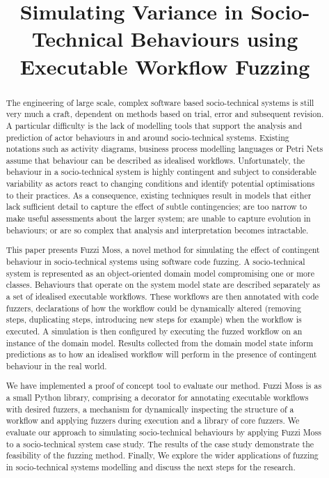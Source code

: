 \documentclass{sig-alternate}
\title{Simulating Variance in Socio-Technical Behaviours using Executable Workflow Fuzzing}
\begin{document}

\maketitle


\begin{abstract}
  The engineering of large scale, complex software based socio-technical systems is still very much a craft, dependent
  on methods based on trial, error and subsequent revision.  A particular difficulty is the lack of modelling tools that
  support the analysis and prediction of actor behaviours in and around socio-technical systems.  Existing notations
  such as activity diagrams, business process modelling languages or Petri Nets assume that behaviour can be described
  as idealised workflows.  Unfortunately, the behaviour in a socio-technical system is highly contingent and subject to
  considerable variability as actors react to changing conditions and identify potential optimisations to their
  practices.  As a consequence, existing techniques result in models that either lack sufficient detail to capture the
  effect of subtle contingencies; are too narrow to make useful assessments about the larger system; are unable to
  capture evolution in behaviours; or are so complex that analysis and interpretation becomes intractable.

  This paper presents Fuzzi Moss, a novel method for simulating the effect of contingent behaviour in socio-technical
  systems using software code fuzzing.  A socio-technical system is represented as an object-oriented domain model
  compromising one or more classes.  Behaviours that operate on the system model state are described separately as a set
  of idealised executable workflows.  These workflows are then annotated with code fuzzers, declarations of how the
  workflow could be dynamically altered (removing steps, duplicating steps, introducing new steps for example) when the
  workflow is executed.  A simulation is then configured by executing the fuzzed workflow on an instance of the domain
  model.  Results collected from the domain model state inform predictions as to how an idealised workflow will perform
  in the presence of contingent behaviour in the real world.
 
  We have implemented a proof of concept tool to evaluate our method. Fuzzi Moss is as a small Python library,
  comprising a decorator for annotating executable workflows with desired fuzzers, a mechanism for dynamically
  inspecting the structure of a workflow and applying fuzzers during execution and a library of core fuzzers.  We
  evaluate our approach to simulating socio-technical behaviours by applying Fuzzi Moss to a socio-technical system case
  study.  The results of the case study demonstrate the feasibility of the fuzzing method.  Finally, We explore the
  wider applications of fuzzing in socio-technical systems modelling and discuss the next steps for the research.
\end{abstract}
\end{document}
